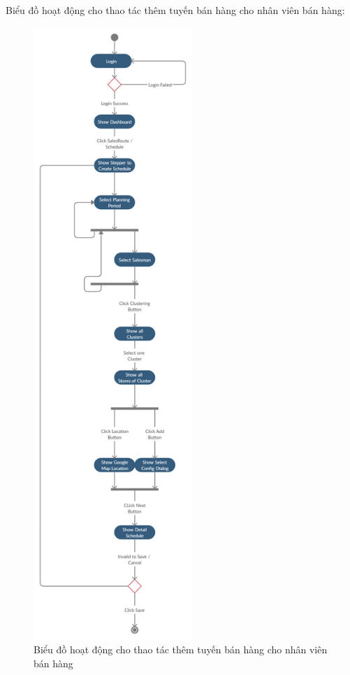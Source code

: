 Biểu đồ hoạt động cho thao tác thêm tuyến bán
hàng cho nhân viên bán hàng:
\begin{figure}[H]
\centering
\includegraphics[width=6cm]{images/activity-diagram/add-schedule.png}
\caption{Biểu đồ hoạt động cho thao tác thêm tuyến bán hàng cho
nhân viên bán hàng}
\end{figure}

